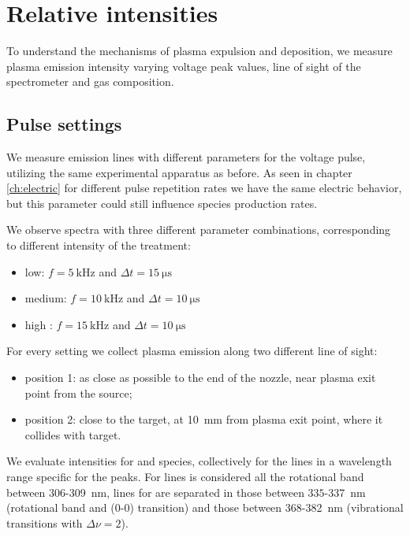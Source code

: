 \section{Relative intensities}
To understand the mechanisms of plasma expulsion and deposition, we measure plasma emission intensity varying voltage peak values, line of sight of the spectrometer and gas composition.

\subsection{Pulse settings}
We measure emission lines with different parameters for the voltage pulse, utilizing the same experimental apparatus as before. As seen in chapter \ref{ch:electric} for different pulse repetition rates we have the same electric behavior, but this parameter could still influence species production rates.

We observe spectra with three different parameter combinations, corresponding to different intensity of the treatment:
\begin{itemize}
 \item low: $f = \SI{5}{\kilo\hertz}$ and $\Delta t = \SI{15}{\micro\second}$
 \item medium: $f = \SI{10}{\kilo\hertz}$ and $\Delta t = \SI{10}{\micro\second}$
 \item high : $f = \SI{15}{\kilo\hertz}$ and $\Delta t = \SI{10}{\micro\second}$
\end{itemize}

For every setting we collect plasma emission along two different line of sight:
\begin{itemize}
 \item position 1: as close as possible to the end of the nozzle, near plasma exit point from the source;
 \item position 2: close to the target, at \SI{10}{\milli\meter} from plasma exit point, where it collides with target.
\end{itemize}

We evaluate intensities for  and  species, collectively for the lines in a wavelength range specific for the peaks. For  lines is considered all the rotational band between $\num{306}$-\SI{309}{\nano\meter}, lines for  are separated in those between $\num{335}$-\SI{337}{\nano\meter} (rotational band and (0-0) transition) and those between $\num{368}$-\SI{382}{\nano\meter} (vibrational transitions with $\Delta \nu = 2$).

